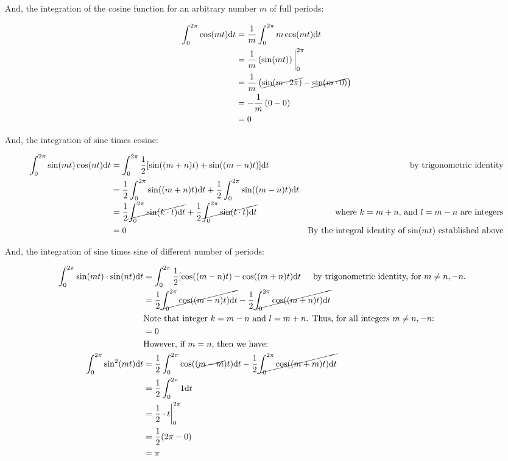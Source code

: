 \documentclass[10pt]{article} %
\begin{document}
And, the integration of the cosine function for an arbitrary number $m$ of full periods:

\begin{align}
    \int_0^{2\pi} \cos(mt)\mathrm{d}t & = \frac1m\int_0^{2\pi}m\cos(mt)\mathrm{d}t \\
    & = \frac1m\left(\sin(mt)\right)\bigg\rvert_0^{2\pi} \\
    & = \frac1m\left(\cancel{\sin(m\cdot2\pi)} - \cancel{\sin(m\cdot 0)}\right) \\
    & = -\frac1m\left(0 - 0\right) \\
    & = 0
\end{align}

And, the integration of sine times cosine:

\begin{align}
    \int_0^{2\pi}\sin(mt)\cos(nt)\mathrm{d}t & = \int_0^{2\pi}\frac12[\sin((m+n)t) +\sin((m-n)t)]\mathrm{d}t &\text{\hspace{0.5cm} by trigonometric identity} \\
    & = \frac12 \int_0^{2\pi}\sin((m+n)t)\mathrm{d}t + \frac12 \int_0^{2\pi}\sin((m-n)t)\mathrm{d}t\\
    & = \frac12 \cancel{\int_0^{2\pi}\sin(k\cdot t)\mathrm{d}t} + \frac12 \cancel{\int_0^{2\pi}\sin(l\cdot t)\mathrm{d}t} &\text{\hspace{0.5cm}  where $k=m+n$, and $l=m-n$ are integers}\\
    & = 0 &\text{By the integral identity of $\sin(mt)$ established above}
\end{align}

And, the integration of sine times sine of different number of periods:

\begin{align}
    \int_0^{2\pi} \sin(mt) \cdot \sin(nt) \mathrm{d}t &= \int_0^{2\pi}\frac12[\cos((m-n)t) - \cos((m+n)t) \mathrm{d}t \text{\hspace{0.5cm}by trigonometric identity, for $m \neq n, -n$.}&\\
    & =\frac12\cancel{\int_0^{2\pi}\cos((m-n)t)\mathrm{d}t} - \frac12\cancel{\int_0^{2\pi}\cos((m+n)t)\mathrm{d}t}\\
    & \text{Note that integer $k = m-n$ and $l = m+n$. Thus, for all integers $m \neq n, -n$:} &\\
    & = 0 \\
    & \text{However, if $m = n$, then we have:}\\
    \int_0^{2\pi} \sin^2(mt)\mathrm{d}t & = \frac12\int_0^{2\pi}\cos((\cancel{m-m})t)\mathrm{d}t - \frac12\cancel{\int_0^{2\pi}\cos((m+m)t)\mathrm{d}t}\\
    & = \frac12\int_0^{2\pi}1\mathrm{d}t\\
    & = \frac12 \cdot t \bigg\rvert_0^{2\pi} \\
    & = \frac12 (2\pi - 0) \\
    & = \pi
\end{align}
\end{document}
